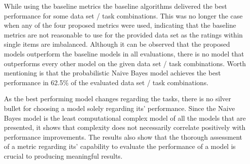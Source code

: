 While using the baseline metrics the baseline algorithms delivered the best performance for some data set / task combinations. This was no longer the case when any of the four proposed metrics were used, indicating that the baseline metrics are not reasonable to use for the provided data set as the ratings within single items are imbalanced. Although it can be observed that the proposed models outperform the baseline models in all evaluations, there is no model that outperforms every other model on the given data set / task combinations. Worth mentioning is that the probabilistic Naive Bayes model achieves the best performance in 62.5\% of the evaluated data set / task combinations. 

As the best performing model changes regarding the tasks, there is no silver bullet for choosing a model solely regarding its' performance. 
Since the Naive Bayes model is the least computational complex model of all the models that are presented, it shows that complexity does not necessarily correlate positively with performance improvements.
The results also show that the thorough assessment of a metric regarding its' capability to evaluate the performance of a model is crucial to producing meaningful results.

